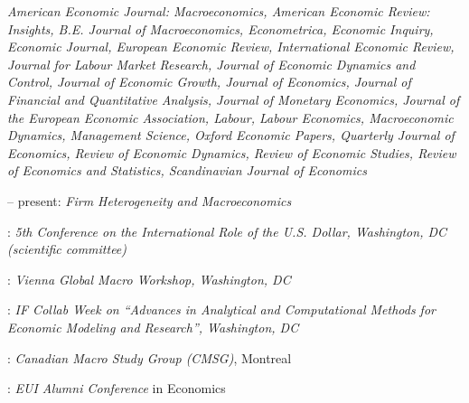 \documentclass[11pt]{article}
\begin{document}
\begin{samepage}
\begin{sloppypar}
\ind \emph{American Economic Journal: Macroeconomics, American Economic Review: Insights, B.E. Journal of Macroeconomics, Econometrica, Economic Inquiry, Economic Journal, European Economic Review, International Economic Review, Journal for Labour Market Research, Journal of Economic Dynamics and Control, Journal of Economic Growth, Journal of Economics, Journal of Financial and Quantitative Analysis, Journal of Monetary Economics, Journal of the European Economic Association, Labour, Labour Economics, Macroeconomic Dynamics, Management Science, Oxford Economic Papers, Quarterly Journal of Economics, Review of Economic Dynamics, Review of Economic Studies, Review of Economics and Statistics, Scandinavian Journal of Economics}
\end{sloppypar}
\end{samepage}
 -- present: \emph{Firm Heterogeneity and Macroeconomics}
\smallskip

: \emph{5th Conference on the International Role of the U.S. Dollar, Washington, DC (scientific committee)}
\smallskip

: \emph{Vienna Global Macro Workshop, Washington, DC}
\smallskip

: \emph{IF Collab Week on ``Advances in Analytical and Computational Methods for Economic Modeling and Research'', Washington, DC}
\smallskip

: \emph{Canadian Macro Study Group (CMSG)}, Montreal
\smallskip

: \emph{EUI Alumni Conference} in Economics

\end{document}
